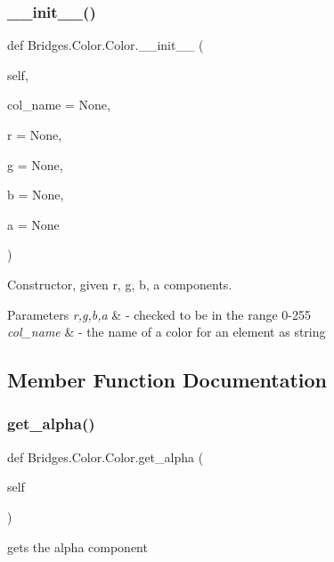 \subsubsection{\texorpdfstring{\+\_\+\+\_\+init\+\_\+\+\_\+()}{\_\_init\_\_()}}
{\footnotesize\ttfamily def Bridges.\+Color.\+Color.\+\_\+\+\_\+init\+\_\+\+\_\+ (\begin{DoxyParamCaption}\item[{}]{self,  }\item[{}]{col\+\_\+name = {\ttfamily None},  }\item[{}]{r = {\ttfamily None},  }\item[{}]{g = {\ttfamily None},  }\item[{}]{b = {\ttfamily None},  }\item[{}]{a = {\ttfamily None} }\end{DoxyParamCaption})}



Constructor, given r, g, b, a components. 


\begin{DoxyParams}{Parameters}
{\em r,g,b,a} & -\/ checked to be in the range 0-\/255 \\
\hline
{\em col\+\_\+name} & -\/ the name of a color for an element as string \\
\hline
\end{DoxyParams}


\subsection{Member Function Documentation}
\mbox{\label{class_bridges_1_1_color_1_1_color_aee2ff0c486cfd6d4f3261b79bafeb2d5}} 
\subsubsection{\texorpdfstring{get\+\_\+alpha()}{get\_alpha()}}
{\footnotesize\ttfamily def Bridges.\+Color.\+Color.\+get\+\_\+alpha (\begin{DoxyParamCaption}\item[{}]{self }\end{DoxyParamCaption})}



gets the alpha component 

